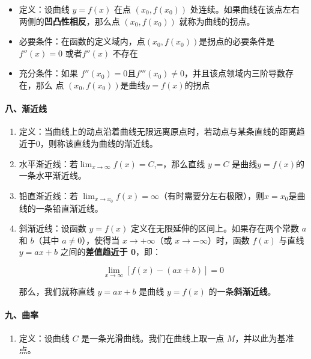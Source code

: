 \documentclass[
]{article}
\begin{document}
\begin{itemize}
\item
  定义：设曲线 \(y = f(x)\) 在点 \((x_0, f(x_0))\)
  处连续。如果曲线在该点左右两侧的\textbf{凹凸性相反}，那么点
  \((x_0, f(x_0))\) 就称为曲线的拐点。
\item
  必要条件：在函数的定义域内，点\((x_0,f(x_0))\)是拐点的必要条件是\(f''(x) = 0\)
  或者\(f''(x)\) 不存在
\item
  充分条件：如果
  \textbf{\(f''(x_0) = 0\)}且\(f'''(x_0) \neq 0\)，并且该点领域内三阶导数存在，那么
  点 \((x_0, f(x_0))\)是曲线\(y=f(x)\)的拐点
\end{itemize}

\paragraph{八、渐近线}\label{ux516bux6e10ux8fd1ux7ebf}

\begin{enumerate}
\def\labelenumi{\arabic{enumi}.}
\item
  定义：当曲线上的动点沿着曲线无限远离原点时，若动点与某条直线的距离趋近于0，则称该直线为曲线的渐近线。
\item
  水平渐近线：若\(\lim_{x \to \infty} f(x)=C\),=，那么直线
  \textbf{\(y = C\)} 是曲线\(y=f(x)\)的一条水平渐近线。
\item
  铅直渐近线：若
  \(\lim_{x \to x_0} f(x)=\infty\)（有时需要分左右极限），则\(x=x_0\)是曲线的一条铅直渐近线。
\item
  斜渐近线：设函数 \(y = f(x)\) 定义在无限延伸的区间上。如果存在两个常数
  \textbf{\(a\)} 和 \textbf{\(b\)}（其中 \textbf{\(a \neq 0\)}），使得当
  \(x \to +\infty\)（或 \(x \to -\infty\)）时，函数 \(f(x)\) 与直线
  \(y = ax + b\) 之间的\textbf{差值趋近于 0}，即：

  \[\lim_{x \to \infty} [f(x) - (ax + b)] = 0\]

  那么，我们就称直线 \textbf{\(y = ax + b\)} 是曲线 \(y = f(x)\)
  的一条\textbf{斜渐近线}。
\end{enumerate}

\paragraph{九、曲率}\label{ux4e5dux66f2ux7387}

\begin{enumerate}
\def\labelenumi{\arabic{enumi}.}
\item
  定义：设曲线 \(C\) 是一条光滑曲线。我们在曲线上取一点
  \(M\)，并以此为基准点。
\end{enumerate}
\end{document}

